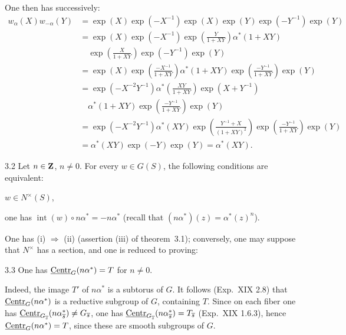 One then has successively:
\begingroup\small
\[
\begin{aligned}
w_\alpha(X)w_{-\alpha}(Y)&=\exp(X)\exp(-X^{-1})\exp(X)\exp(Y)\exp(-Y^{-1})\exp(Y)\\
&=\exp(X)\exp(-X^{-1})\exp\left(\frac Y{1+XY}\right)\alpha^*(1+XY)\\
&\quad\exp\left(\frac X{1+XY}\right)\exp(-Y^{-1})\exp(Y)\\
&=\exp(X)\exp\left(\frac{-X^{-1}}{1+XY}\right)\alpha^*(1+XY)\exp\left(\frac{-Y^{-1}}{1+XY}\right)\exp(Y)\\
&=\exp(-X^{-2}Y^{-1})\alpha^*\left(\frac{XY}{1+XY}\right)\exp(X+Y^{-1})\\
&\quad\alpha^*(1+XY)\exp\left(\frac{-Y^{-1}}{1+XY}\right)\exp(Y)\\
&=\exp(-X^{-2}Y^{-1})\alpha^*(XY)\exp\left(\frac{Y^{-1}+X}{(1+XY)^2}\right)\exp\left(\frac{-Y^{-1}}{1+XY}\right)\exp(Y)\\
&=\alpha^*(XY)\exp(-Y)\exp(Y)=\alpha^*(XY).
\end{aligned}
\]
\endgroup

\begin{corollary}{3.2}\label{XX.3.2}
Let $n\in\mathbf{Z}$, $n\ne0$. For every $w\in G(S)$, the following conditions are equivalent:
\begin{enumeratei}
\item $w\in N^\times(S)$,
\item one has $\operatorname{int}(w)\circ n\alpha^*=-n\alpha^*$ (recall that $(n\alpha^*)(z)=\alpha^*(z)^n$).
\end{enumeratei}
\end{corollary}
One has (i) $\Rightarrow$ (ii) (assertion (iii) of theorem~3.1); conversely, one may suppose that $N^\times$ has a section, and one is reduced to proving:
\begin{lemma}{3.3}\label{XX.3.3}
One has $\underline{\mathrm{Centr}}_G(n\alpha^*)=T$ for $n\ne0$.
\end{lemma}
Indeed, the image $T'$ of $n\alpha^*$ is a subtorus of $G$. It follows (Exp.~XIX 2.8) that $\underline{\mathrm{Centr}}_G(n\alpha^*)$ is a reductive subgroup of $G$, containing $T$. Since on each fiber one has $\underline{\mathrm{Centr}}_{G_{\overline{s}}}(n\alpha^*_{\overline{s}})\ne G_{\overline{s}}$, one has $\underline{\mathrm{Centr}}_{G_{\overline{s}}}(n\alpha^*_{\overline{s}})=T_{\overline{s}}$ (Exp.~XIX 1.6.3{\renewcommand{\thefootnote}{(27)}}), hence $\underline{\mathrm{Centr}}_G(n\alpha^*)=T$, since these are smooth subgroups of $G$.

